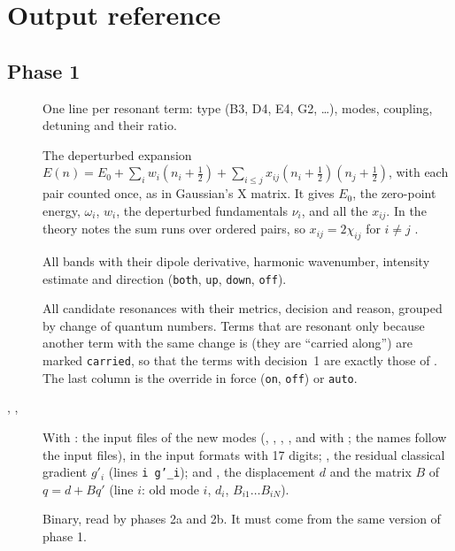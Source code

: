 \chapter{Output reference}\label{ch:outputs}

\section{Phase 1}
\begin{description}
\item[] One line per resonant term: type (B3, D4, E4,
  G2, \ldots), modes, coupling, detuning and their ratio.
\item[]\label{sec:dunham} The deperturbed expansion
  $E(n)=E_0+\sum_i w_i(n_i+\frac12)+\sum_{i\le j}x_{ij}(n_i+\frac12)(n_j+\frac12)$,
  with each pair counted once, as in Gaussian's X matrix. It gives $E_0$,
  the zero-point energy, $\omega_i$, $w_i$, the deperturbed fundamentals
  $\nu_i$, and all the $x_{ij}$. In the theory notes the sum runs over
  ordered pairs, so $x_{ij}=2\chi_{ij}$ for $i\ne j$ .
\item[] All bands with their dipole derivative, harmonic
  wavenumber, intensity estimate and direction (\texttt{both}, \texttt{up},
  \texttt{down}, \texttt{off}).
\item[] All candidate resonances with their
  metrics, decision and reason, grouped by change of quantum numbers. Terms
  that are resonant only because another term with the same change is
  (they are ``carried along'') are marked \texttt{carried}, so that the
  terms with decision~1 are exactly those of . The
  last column is the override in force (\texttt{on}, \texttt{off}) or
  \texttt{auto}.
\item[, , ]
  With : the input files of the new modes
  (, ,
  , , and
   with ; the names follow the input
  files), in the input formats with 17 digits; ,
  the residual classical gradient $g'_i$ (lines \texttt{i g'\_i}); and
  , the displacement $d$ and the matrix $B$ of
  $q=d+Bq'$ (line $i$: old mode $i$, $d_i$, $B_{i1}\ldots B_{iN}$).
\item[] Binary, read by phases 2a and 2b. It must come
  from the same version of phase 1.
\end{description}
